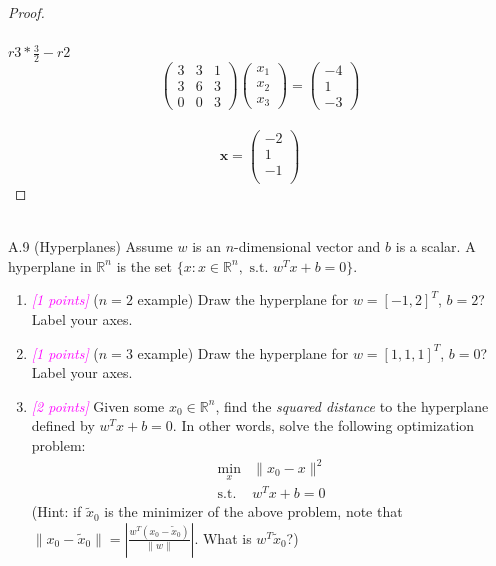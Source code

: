 \documentclass{article}
\newcommand{\field}[1]{\mathbb{#1}}
\newcommand{\1}{\mathbf{1}}
\newcommand{\R}{\field{R}} %
\newcommand{\points}[1]{\small\textcolor{magenta}{\emph{[#1 points]}} \normalsize}
\begin{document}
{{\begin{proof}
\[\]\\
$r3*\frac{3}{2}-r2$
\[
\begin{pmatrix*}
        3&3&1\\
        3&6&3\\
        0&0&3
\end{pmatrix*}
\begin{pmatrix*}
                x_1\\x_2\\x_3
        \end{pmatrix*}
        =
        \begin{pmatrix*}
                        -4\\1\\-3
        \end{pmatrix*}
\]\\
$$\mathbf{x}=\begin{pmatrix}
        -2\\
        1\\
        -1\\
\end{pmatrix}$$
\end{proof}
}}\\

A.9 (Hyperplanes) Assume $w$ is an $n$-dimensional vector and $b$ is a scalar. A hyperplane in $\R^n$ is the set $\{x : x\in \R^n,\text{ s.t. } w^T x + b = 0\}$.
\begin{enumerate}
	\item \points{1} ($n=2$ example) Draw the hyperplane for $w=[-1,2]^T$, $b=2$? Label your axes.
	\item \points{1} ($n=3$ example) Draw the hyperplane for $w=[1,1,1]^T$, $b=0$? Label your axes.
	\item \points{2} Given some $x_0 \in \R^n$, find the \emph{squared distance} to the hyperplane defined by $w^T x + b=0$.
	In other words, solve the following optimization problem:
	\begin{align*}
	\min_x& \|x_0 - x \|^2\\
	\text{s.t. }&w^Tx +b = 0
	\end{align*}
	(Hint: if $\widetilde{x}_0$ is the minimizer of the above problem, note that $\| x_0 - \widetilde{x}_0 \| = | \frac{w^T(x_0 - \widetilde{x}_0)}{\|w\|} |$. What is $w^T \widetilde{x}_0$?)
\end{enumerate} 
\end{document}
